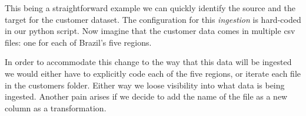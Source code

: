 \begin{Shaded}
\begin{Highlighting}[]

\OperatorTok{=}\NormalTok{)}

\OperatorTok{=}\OperatorTok{=}\NormalTok{)}

\OperatorTok{=}\OperatorTok{=}\NormalTok{)}
\end{Highlighting}
\end{Shaded}

This being a straightforward example we can quickly identify the source
and the target for the customer dataset. The configuration for this
\emph{ingestion} is hard-coded in our python script. Now imagine that
the customer data comes in multiple csv files: one for each of Brazil's
five regions.

\begin{Shaded}
\begin{Highlighting}[]
\KeywordTok{|}\ExtensionTok{{-}{-}}
\KeywordTok{|}\ExtensionTok{{-}{-}}
\KeywordTok{|}\ExtensionTok{{-}{-}}
\KeywordTok{|}\ExtensionTok{{-}{-}}
\KeywordTok{|}\ExtensionTok{{-}{-}}
\end{Highlighting}
\end{Shaded}

In order to accommodate this change to the way that this data will be
ingested we would either have to explicitly code each of the five
regions, or iterate each file in the customers folder. Either way we
loose visibility into what data is being ingested. Another pain arises
if we decide to add the name of the file as a new column as a
transformation.

